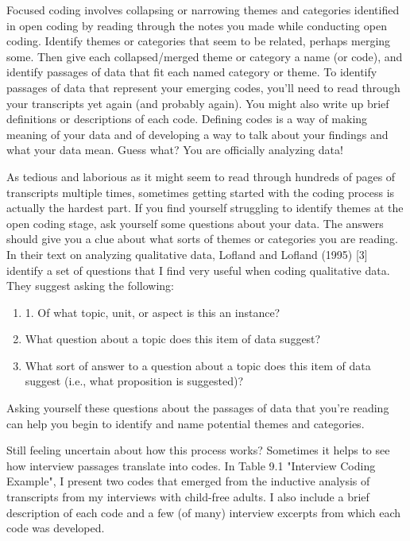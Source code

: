 Focused coding involves collapsing or narrowing themes and categories identified in open coding by reading through the notes you made while conducting open coding. Identify themes or categories that seem to be related, perhaps merging some. Then give each collapsed/merged theme or category a name (or code), and identify passages of data that fit each named category or theme. To identify passages of data that represent your emerging codes, you’ll need to read through your transcripts yet again (and probably again). You might also write up brief definitions or descriptions of each code. Defining codes is a way of making meaning of your data and of developing a way to talk about your findings and what your data mean. Guess what? You are officially analyzing data!

As tedious and laborious as it might seem to read through hundreds of pages of transcripts multiple times, sometimes getting started with the coding process is actually the hardest part. If you find yourself struggling to identify themes at the open coding stage, ask yourself some questions about your data. The answers should give you a clue about what sorts of themes or categories you are reading. In their text on analyzing qualitative data, Lofland and Lofland (1995) [3] identify a set of questions that I find very useful when coding qualitative data. They suggest asking the following:

\begin{enumerate}
	\item 1. Of what topic, unit, or aspect is this an instance?
	\item What question about a topic does this item of data suggest?
	\item What sort of answer to a question about a topic does this item of data suggest (i.e., what proposition is suggested)?
\end{enumerate}

Asking yourself these questions about the passages of data that you’re reading can help you begin to identify and name potential themes and categories.

Still feeling uncertain about how this process works? Sometimes it helps to see how interview passages translate into codes. In Table 9.1 "Interview Coding Example", I present two codes that emerged from the inductive analysis of transcripts from my interviews with child-free adults. I also include a brief description of each code and a few (of many) interview excerpts from which each code was developed.

